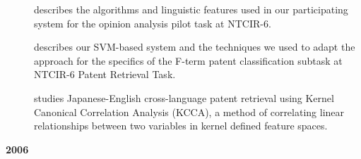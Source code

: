 \begin{description}
\item[\cite{Yaoyong07c}] describes the algorithms and linguistic features used in our participating system for the opinion analysis pilot task at NTCIR-6.

\item[\cite{Yaoyong07b}] describes our SVM-based system and the techniques we used to adapt the approach for the specifics of the F-term patent classification subtask at NTCIR-6 Patent Retrieval Task.

\item[\cite{Yaoyong07d}] studies Japanese-English cross-language patent retrieval using Kernel Canonical Correlation Analysis (KCCA), a method of correlating linear relationships between two variables in kernel defined feature spaces.

\end{description}

\textbf{2006}

